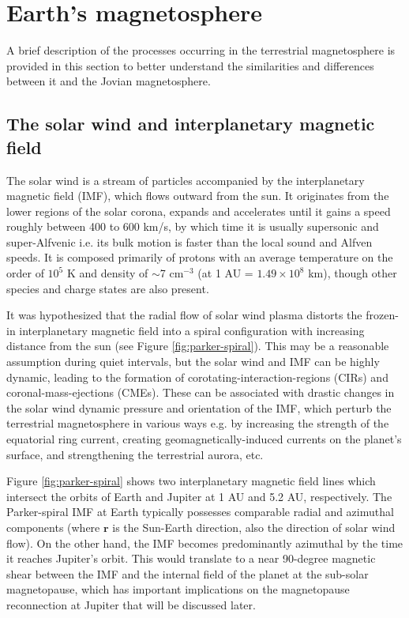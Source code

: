 \section{Earth's magnetosphere}
A brief description of the processes occurring in the terrestrial magnetosphere is provided in this section to better understand the similarities and differences between it and the Jovian magnetosphere.

\subsection{The solar wind and interplanetary magnetic field}
The solar wind is a stream of particles accompanied by the interplanetary magnetic field (IMF), which flows outward from the sun. It originates from the lower regions of the solar corona, expands and accelerates until it gains a speed roughly between 400 to 600 km/s, by which time it is usually supersonic and super-Alfvenic \cite{Gombosi1998PhysicsEnvironment} i.e. its bulk motion is faster than the local sound and Alfven speeds. It is composed primarily of protons with an average temperature on the order of $10^5$ K and density of $\sim$7 cm$^{-3}$ (at 1 AU = $1.49 \times 10^{8}$ km), though other species and charge states are also present.

It was hypothesized that the radial flow of solar wind plasma distorts the frozen-in interplanetary magnetic field into a spiral configuration with increasing distance from the sun \cite{Parker1958DynamicsFields.,Ness1964SolarField} (see Figure \ref{fig:parker-spiral}). This may be a reasonable assumption during quiet intervals, but the solar wind and IMF can be highly dynamic, leading to the formation of corotating-interaction-regions (CIRs) and coronal-mass-ejections (CMEs). These can be associated with drastic changes in the solar wind dynamic pressure and orientation of the IMF, which perturb the terrestrial magnetosphere in various ways \cite{Borovsky2006DifferencesStorms,Denton2006GeomagneticWind} e.g. by increasing the strength of the equatorial ring current, creating geomagnetically-induced currents on the planet's surface, and strengthening the terrestrial aurora, etc.

Figure \ref{fig:parker-spiral} shows two interplanetary magnetic field lines which intersect the orbits of Earth and Jupiter at 1 AU and 5.2 AU, respectively. The Parker-spiral IMF at Earth typically possesses comparable radial and azimuthal components (where $\mathbf{r}$ is the Sun-Earth direction, also the direction of solar wind flow). On the other hand, the IMF becomes predominantly azimuthal by the time it reaches Jupiter's orbit. This would translate to a near 90-degree magnetic shear between the IMF and the internal field of the planet at the sub-solar magnetopause, which has important implications on the magnetopause reconnection at Jupiter that will be discussed later.


